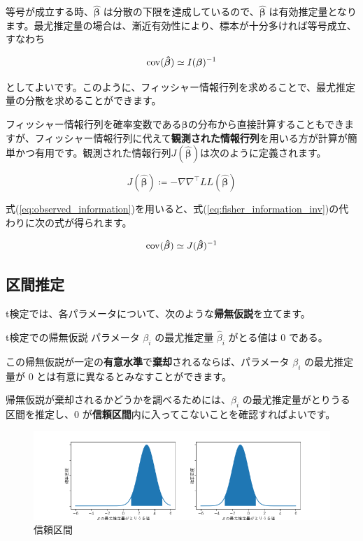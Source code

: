 等号が成立する時、$\bm{\hat\beta}$ は分散の下限を達成しているので、$\bm{\hat\beta}$ は有効推定量となります。最尤推定量の場合は、漸近有効性により、標本が十分多ければ等号成立、すなわち

\begin{equation}
    \label{eq:fisher_information_inv}
    \operatorname*{cov}(\bm{\hat\beta}) \simeq I(\bm\beta)^{-1}
\end{equation}

としてよいです。このように、フィッシャー情報行列を求めることで、最尤推定量の分散を求めることができます。

フィッシャー情報行列を確率変数である$\bm\beta$の分布から直接計算することもできますが、フィッシャー情報行列に代えて\textbf{観測された情報行列}を用いる方が計算が簡単かつ有用です\cite{Efron1978}。観測された情報行列$J(\bm{\hat\beta})$は次のように定義されます。

\begin{equation}
    \label{eq:observed_information}
    J(\bm{\hat\beta}) \coloneqq -\nabla\nabla^\top LL(\bm{\hat\beta})
\end{equation}

式(\ref{eq:observed_information})を用いると、式(\ref{eq:fisher_information_inv})の代わりに次の式が得られます。

\begin{equation}
    \label{eq:observed_information_inv}
    \operatorname*{cov}(\bm{\hat\beta}) \simeq J(\bm{\hat\beta})^{-1}
\end{equation}

\subsection{区間推定}\label{ssec:interval_est}

t検定では、各パラメータについて、次のような\textbf{帰無仮説}を立てます。

\begin{itembox}[l]{t検定での帰無仮説}
    パラメータ $\beta_i$ の最尤推定量 $\hat\beta_i$ がとる値は $0$ である。
\end{itembox}

この帰無仮説が一定の\textbf{有意水準}で\textbf{棄却}されるならば、パラメータ $\beta_i$ の最尤推定量が $0$ とは有意に異なるとみなすことができます。

帰無仮説が棄却されるかどうかを調べるためには、$\beta_i$ の最尤推定量がとりうる区間を推定し、$0$ が\textbf{信頼区間}内に入ってこないことを確認すればよいです。

\begin{figure}[ht]
    \centering
    \includegraphics[width=0.9\hsize]{figure/interval_estimation.png}
    \caption{信頼区間}
    \label{fig:interval_est}
\end{figure}


